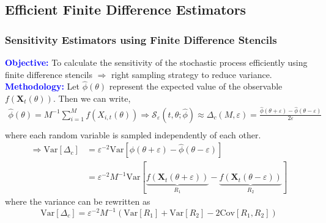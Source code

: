 \documentclass[a4paper,10pt]{beamer}
\newcommand{\BS}[1]{\boldsymbol{#1}}
\newcommand{\sqb}[1]{\left[ #1 \right]}
\newcommand{\rb}[1]{\left( #1 \right)}
\begin{document}
	\begin{frame}
		\subsection{Efficient Finite Difference Estimators}
		\frametitle{\large Sensitivity Estimators using Finite Difference Stencils}
		\footnotesize
		\textcolor{blue}{\textbf{Objective:}} To calculate the sensitivity of the stochastic process efficiently using finite difference stencils $\Rightarrow$ right sampling strategy to reduce variance.\\
		\vspace{0.15cm}
		\textcolor{blue}{\textbf{Methodology:}}
		Let $\hat{\phi}\rb{\theta}$ represent the expected value of the observable $f\rb{\BS{X}_{t}\rb{\theta}}$. Then we can write,
		\footnotesize
		\begin{align*}
			\hat{\phi}\rb{\theta} = M^{-1} \sum_{i=1}^{M} f\rb{X_{i,t}\rb{\theta}} \Rightarrow \mathcal{S}_{\varepsilon} \rb{t,\theta;\hat{\phi}} \approx \Delta_{c} \rb{M,\varepsilon} = \frac{\hat{\phi}\rb{\theta + \varepsilon}-\hat{\phi}\rb{\theta-\varepsilon}}{2\varepsilon} \\
		\end{align*}
		where each random variable is sampled independently of each other.
		\footnotesize
		\begin{align*}
			\Rightarrow \text{Var}\sqb{\Delta_{c}} &= \varepsilon^{-2} \text{Var} \sqb{\hat{\phi} \rb{\theta + \varepsilon} - \hat{\phi} \rb{\theta - \varepsilon}} \\ &= \varepsilon^{-2} M^{-1} \text{Var} \sqb{\underbrace{f\rb{\BS{X}_{t}\rb{\theta + \varepsilon}}}_{R_{1}} - \underbrace{f\rb{\BS{X}_{t}\rb{\theta - \varepsilon}}}_{R_{2}}}
		\end{align*}
		where the variance can be rewritten as
		\footnotesize
		$$ \text{Var}\sqb{\Delta_{c}} = \varepsilon^{-2} M^{-1} \rb{\text{Var}\sqb{R_{1}} + \text{Var}\sqb{R_{2}} - 2 \text{Cov} \sqb{R_{1},R_{2}}} $$ 
	\end{frame}
	
\end{document}
